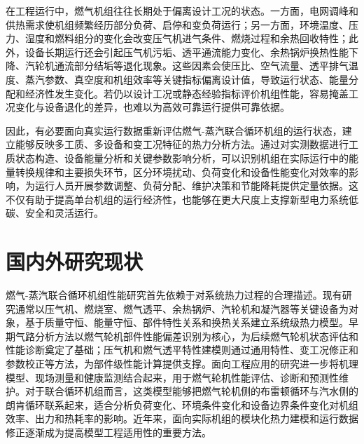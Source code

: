 在工程运行中，燃气机组往往长期处于偏离设计工况的状态。一方面，电网调峰和供热需求使机组频繁经历部分负荷、启停和变负荷运行；另一方面，环境温度、压力、湿度和燃料组分的变化会改变压气机进气条件、燃烧过程和余热回收特性；此外，设备长期运行还会引起压气机污垢、透平通流能力变化、余热锅炉换热性能下降、汽轮机通流部分结垢等退化现象。这些因素会使压比、空气流量、透平排气温度、蒸汽参数、真空度和机组效率等关键指标偏离设计值，导致运行状态、能量分配和经济性发生变化。若仍以设计工况或静态经验指标评价机组性能，容易掩盖工况变化与设备退化的差异，也难以为高效可靠运行提供可靠依据。

因此，有必要面向真实运行数据重新评估燃气-蒸汽联合循环机组的运行状态，建立能够反映多工质、多设备和变工况特征的热力分析方法。通过对实测数据进行工质状态构造、设备能量分析和关键参数影响分析，可以识别机组在实际运行中的能量转换规律和主要损失环节，区分环境扰动、负荷变化和设备性能变化对效率的影响，为运行人员开展参数调整、负荷分配、维护决策和节能降耗提供定量依据。这不仅有助于提高单台机组的运行经济性，也能够在更大尺度上支撑新型电力系统低碳、安全和灵活运行。

\section{国内外研究现状}

燃气-蒸汽联合循环机组性能研究首先依赖于对系统热力过程的合理描述。现有研究通常以压气机、燃烧室、燃气透平、余热锅炉、汽轮机和凝汽器等关键设备为对象，基于质量守恒、能量守恒、部件特性关系和换热关系建立系统级热力模型。早期气路分析方法以燃气轮机部件性能偏差识别为核心，为后续燃气轮机状态评估和性能诊断奠定了基础\cite{urban1973gpa,stamatis2011gpa,fentaye2019review}；压气机和燃气透平特性建模则通过通用特性、变工况修正和参数校正等方法，为部件级性能计算提供支撑\cite{zhang1996compressor,lu1996turbine,volponi1999corrections}。面向工程应用的研究进一步将机理模型、现场测量和健康监测结合起来，用于燃气轮机性能评估、诊断和预测性维护\cite{tahan2017health,hanachi2018survey}。对于联合循环机组而言，这类模型能够把燃气轮机侧的布雷顿循环与汽水侧的朗肯循环联系起来，适合分析负荷变化、环境条件变化和设备边界条件变化对机组效率、出力和热耗率的影响。近年来，面向实际机组的模块化热力建模和运行数据修正逐渐成为提高模型工程适用性的重要方法\cite{wang2023hrsg,tsoutsanis2014map,ying2023diagnostic}。

